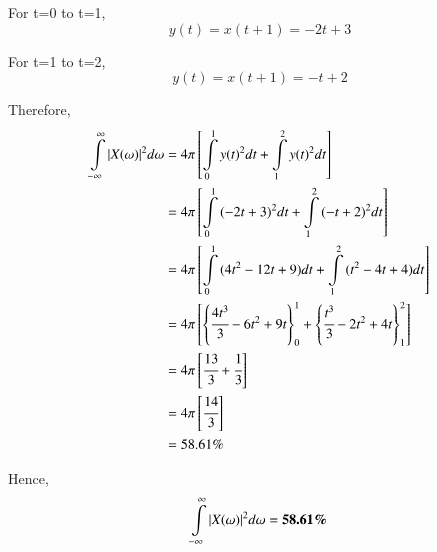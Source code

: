 \documentclass[journal,12pt,twocolumn]{IEEEtran}
\begin{document}
For t=0 to t=1,\\
$$y(t) = x(t+1) = -2t + 3$$

For t=1 to t=2, \\
$$y(t) = x(t+1) = -t + 2$$

Therefore,\\

\begin{align}
  \displaystyle\int\limits_{-\infty}^{\infty} \vert X(\omega)\vert^2 d\omega &= 4\pi \left[ \displaystyle\int\limits_{0}^{1} {y(t)}^2 dt +  \displaystyle\int\limits_{1}^{2} {y(t)}^2 dt\right]\\
  &= 4\pi \left[ \displaystyle\int\limits_{0}^{1} {(-2t+3)}^2 dt +  \displaystyle\int\limits_{1}^{2} {(-t+2)}^2 dt\right]\\
  &= 4\pi \left[ \displaystyle\int\limits_{0}^{1} {(4t^2 - 12t +9)} dt +  \displaystyle\int\limits_{1}^{2} {(t^2 - 4t + 4)} dt\right]\\
  &= 4\pi \left[\left\{\cfrac{4t^3}{3}-6t^2+9t\right\}_{0}^{1} + \left\{\cfrac{t^3}{3}-2t^2+4t\right\}_{1}^{2}\right]\\
  &= 4\pi \left[\cfrac{13}{3}+\cfrac{1}{3}\right]\\
  &= 4\pi \left[\cfrac{14}{3}\right]\\
  &= 58.61\%
\end{align}

Hence,
$$ \displaystyle\int\limits_{-\infty}^{\infty} \vert X(\omega)\vert^2 d\omega = \textbf{58.61\%}$$
\end{document}
